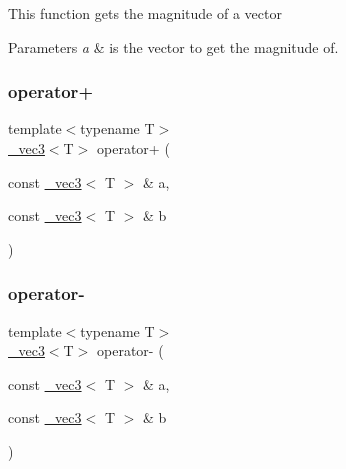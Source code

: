 This function gets the magnitude of a vector 
\begin{DoxyParams}{Parameters}
{\em a} & is the vector to get the magnitude of. \\
\hline
\end{DoxyParams}
\mbox{\label{class__vec3_a1b8322c801946f486a2f45e42249fc46}} 
\subsubsection{\texorpdfstring{operator+}{operator+}}
{\footnotesize\ttfamily template$<$typename T$>$ \\
\hyperlink{class__vec3}{\+\_\+vec3}$<$T$>$ operator+ (\begin{DoxyParamCaption}\item[{const \hyperlink{class__vec3}{\+\_\+vec3}$<$ T $>$ \&}]{a,  }\item[{const \hyperlink{class__vec3}{\+\_\+vec3}$<$ T $>$ \&}]{b }\end{DoxyParamCaption})\hspace{0.3cm}{\ttfamily [friend]}}

\mbox{\label{class__vec3_aecdf47bd765b987f184e062d09c16734}} 
\subsubsection{\texorpdfstring{operator-\/}{operator-}}
{\footnotesize\ttfamily template$<$typename T$>$ \\
\hyperlink{class__vec3}{\+\_\+vec3}$<$T$>$ operator-\/ (\begin{DoxyParamCaption}\item[{const \hyperlink{class__vec3}{\+\_\+vec3}$<$ T $>$ \&}]{a,  }\item[{const \hyperlink{class__vec3}{\+\_\+vec3}$<$ T $>$ \&}]{b }\end{DoxyParamCaption})\hspace{0.3cm}{\ttfamily [friend]}}

\mbox{\label{class__vec3_a06648065995e22b2f6bdda8e9e32ab85}} 
